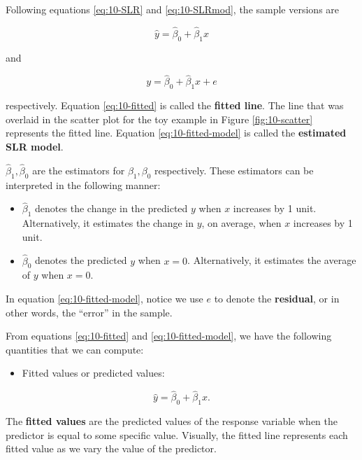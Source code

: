 \documentclass[
]{book}
\providecommand{\tightlist}{%
  \setlength{\itemsep}{0pt}\setlength{\parskip}{0pt}}
\begin{document}
Following equations \eqref{eq:10-SLR} and \eqref{eq:10-SLRmod}, the sample versions are

\begin{equation} 
\hat{y}=\hat{\beta}_0+\hat{\beta}_1 x
\label{eq:10-fitted}
\end{equation}

and

\begin{equation} 
y=\hat{\beta}_0+\hat{\beta}_1 x + e
\label{eq:10-fitted-model}
\end{equation}

respectively. Equation \eqref{eq:10-fitted} is called the \textbf{fitted line}. The line that was overlaid in the scatter plot for the toy example in Figure \ref{fig:10-scatter} represents the fitted line. Equation \eqref{eq:10-fitted-model} is called the \textbf{estimated SLR model}.

\(\hat{\beta}_1,\hat{\beta}_0\) are the estimators for \(\beta_1,\beta_0\) respectively. These estimators can be interpreted in the following manner:

\begin{itemize}
\tightlist
\item
  \(\hat{\beta}_1\) denotes the change in the predicted \(y\) when \(x\) increases by 1 unit. Alternatively, it estimates the change in \(y\), on average, when \(x\) increases by 1 unit.
\item
  \(\hat{\beta}_0\) denotes the predicted \(y\) when \(x=0\). Alternatively, it estimates the average of \(y\) when \(x=0\).
\end{itemize}

In equation \eqref{eq:10-fitted-model}, notice we use \(e\) to denote the \textbf{residual}, or in other words, the ``error'' in the sample.

From equations \eqref{eq:10-fitted} and \eqref{eq:10-fitted-model}, we have the following quantities that we can compute:

\begin{itemize}
\tightlist
\item
  Fitted values or predicted values:
\end{itemize}

\begin{equation}
\hat{y} = \hat{\beta}_0+\hat{\beta}_1 x.
\label{eq:10-fits}
\end{equation}

The \textbf{fitted values} are the predicted values of the response variable when the predictor is equal to some specific value. Visually, the fitted line represents each fitted value as we vary the value of the predictor.
\end{document}

